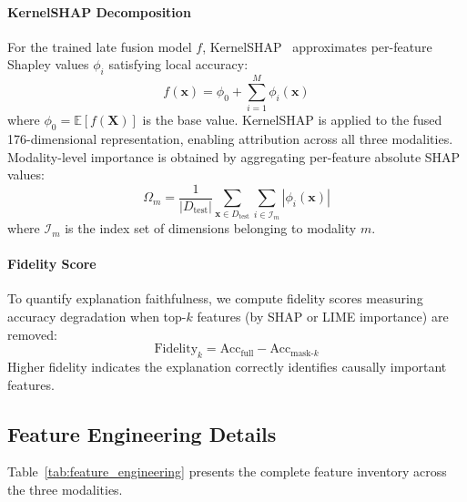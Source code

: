 \documentclass[conference]{IEEEtran}
\begin{document}
\paragraph{KernelSHAP Decomposition}
For the trained late fusion model $f$, KernelSHAP~\cite{lundberg2017}
approximates per-feature Shapley values $\phi_i$ satisfying local accuracy:
\begin{equation}
  f(\mathbf{x}) = \phi_0 + \sum_{i=1}^{M} \phi_i(\mathbf{x})
  \label{eq:shap_decomp}
\end{equation}
where $\phi_0 = \mathbb{E}[f(\mathbf{X})]$ is the base value. KernelSHAP
is applied to the fused 176-dimensional representation, enabling attribution
across all three modalities. Modality-level importance is obtained by
aggregating per-feature absolute SHAP values:
\begin{equation}
  \Omega_m = \frac{1}{|D_{\text{test}}|}\sum_{\mathbf{x} \in D_{\text{test}}} \sum_{i \in \mathcal{I}_m} |\phi_i(\mathbf{x})|
  \label{eq:modality_importance}
\end{equation}
where $\mathcal{I}_m$ is the index set of dimensions belonging to modality $m$.

\paragraph{Fidelity Score}
To quantify explanation faithfulness, we compute fidelity scores measuring
accuracy degradation when top-$k$ features (by SHAP or LIME importance)
are removed:
\begin{equation}
  \text{Fidelity}_k = \text{Acc}_{\text{full}} - \text{Acc}_{\text{mask-}k}
  \label{eq:fidelity}
\end{equation}
Higher fidelity indicates the explanation correctly identifies causally
important features.

\subsection{Feature Engineering Details}
\label{subsec:features}

Table~\ref{tab:feature_engineering} presents the complete feature inventory
across the three modalities.
\end{document}
